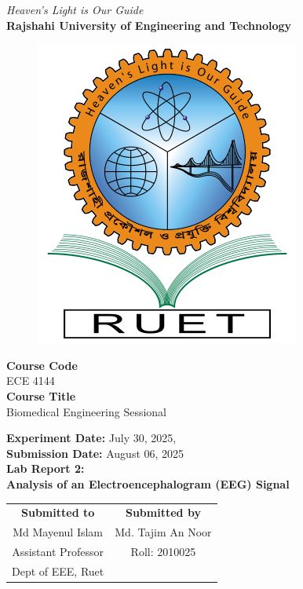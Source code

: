 \vspace*{\fill}
\begin{center}

    \emph{Heaven's Light is Our Guide} \\
    \textbf{Rajshahi University of Engineering and Technology} \\

    \begin{figure}[H]
        \centering
        \includegraphics[scale=.34]{images/RUET_logo.png}
        \label{fig:ruet_logo}
    \end{figure}
    \vspace{5mm}

    \textbf{Course Code}\\
    ECE 4144\\
    \vspace{3mm}
    \textbf{Course Title}\\
    Biomedical Engineering Sessional

    \vspace{5mm}
    \textbf{Experiment Date:} {July 30, 2025},\\
    \textbf{Submission Date:} {August 06, 2025}\\

    \vspace{5mm}
    \textbf{Lab Report 2: \\
        Analysis of an Electroencephalogram (EEG) Signal}

    \vspace{15mm}

    \begin{tabular}{c|c}
        \textbf{Submitted to} & \textbf{Submitted by} \\
        Md Mayenul Islam      & Md. Tajim An Noor     \\
        Assistant Professor   & Roll: 2010025         \\
        Dept of EEE, Ruet     &                       \\
    \end{tabular}

\end{center}
\vspace*{\fill}
